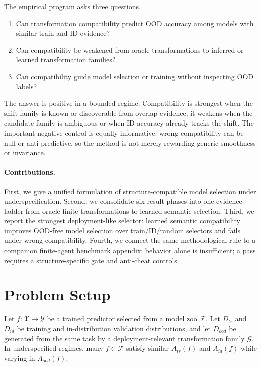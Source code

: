 \documentclass[10pt,twocolumn]{article}
\begin{document}
The empirical program asks three questions.
\begin{enumerate}
  \item Can transformation compatibility predict OOD accuracy among models with
  similar train and ID evidence?
  \item Can compatibility be weakened from oracle transformations to inferred or
  learned transformation families?
  \item Can compatibility guide model selection or training without inspecting
  OOD labels?
\end{enumerate}

The answer is positive in a bounded regime. Compatibility is strongest when the
shift family is known or discoverable from overlap evidence; it weakens when the
candidate family is ambiguous or when ID accuracy already tracks the shift. The
important negative control is equally informative: wrong compatibility can be
null or anti-predictive, so the method is not merely rewarding generic
smoothness or invariance.

\paragraph{Contributions.}
First, we give a unified formulation of structure-compatible model selection
under underspecification. Second, we consolidate six result phases into one
evidence ladder from oracle finite transformations to learned semantic
selection. Third, we report the strongest deployment-like selector: learned
semantic compatibility improves OOD-free model selection over train/ID/random
selectors and fails under wrong compatibility. Fourth, we connect the same
methodological rule to a companion finite-agent benchmark appendix: behavior
alone is insufficient; a pass requires a structure-specific gate and anti-cheat
controls.

\section{Problem Setup}

Let $f: \mathcal{X} \rightarrow \mathcal{Y}$ be a trained predictor selected
from a model zoo $\mathcal{F}$. Let $D_{tr}$ and $D_{id}$ be training and
in-distribution validation distributions, and let $D_{ood}$ be generated from
the same task by a deployment-relevant transformation family
$\mathcal{G}$. In underspecified regimes, many $f \in \mathcal{F}$ satisfy
similar $A_{tr}(f)$ and $A_{id}(f)$ while varying in $A_{ood}(f)$.
\end{document}
